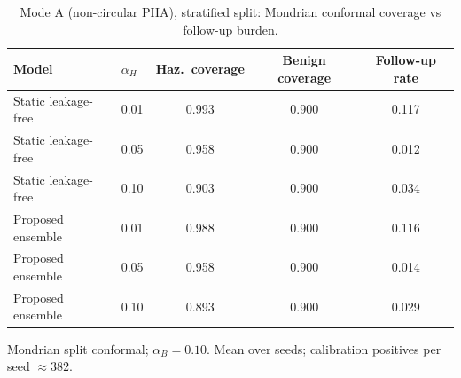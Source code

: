 \begin{table}[t]
\centering
\small
\caption{Mode A (non-circular PHA), stratified split: Mondrian conformal coverage vs follow-up burden.}
\label{tab:conf_pha_stratified}
\begin{tabular}{llccc}
\toprule
Model & $\alpha_H$ & Haz.\ coverage & Benign coverage & Follow-up rate \\
\midrule
Static leakage-free & 0.01 & 0.993 & 0.900 & 0.117 \\
Static leakage-free & 0.05 & 0.958 & 0.900 & 0.012 \\
Static leakage-free & 0.10 & 0.903 & 0.900 & 0.034 \\
\midrule
Proposed ensemble & 0.01 & 0.988 & 0.900 & 0.116 \\
Proposed ensemble & 0.05 & 0.958 & 0.900 & 0.014 \\
Proposed ensemble & 0.10 & 0.893 & 0.900 & 0.029 \\
\bottomrule
\end{tabular}
\par\vspace{2pt}\footnotesize Mondrian split conformal; $\alpha_B=0.10$. Mean over seeds; calibration positives per seed $\approx 382$.
\end{table}
